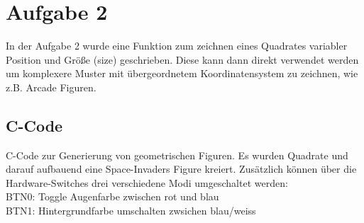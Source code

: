 \section{Aufgabe 2} \label{ex2}
In der Aufgabe 2 wurde eine Funktion zum zeichnen eines Quadrates variabler Position und Größe (size) geschrieben. Diese kann 
dann direkt verwendet werden um komplexere Muster mit übergeordnetem Koordinatensystem zu zeichnen, wie z.B. Arcade Figuren.

\subsection{C-Code}
C-Code zur Generierung von geometrischen Figuren. Es wurden Quadrate und darauf aufbauend eine Space-Invaders 
Figure kreiert. Zusätzlich können über die Hardware-Switches drei verschiedene Modi umgeschaltet werden:\\
BTN0: Toggle Augenfarbe zwischen rot und blau\\
BTN1: Hintergrundfarbe umschalten zwsichen blau/weiss\\

